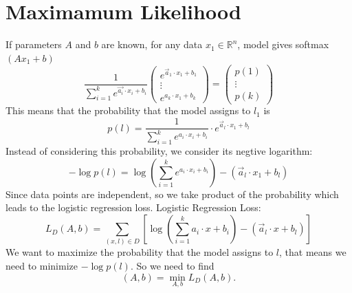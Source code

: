 \section{Maximamum Likelihood}
If parameters $A$ and $b$ are known, for any data $x_1\in \mathbb{R}^n$, model gives softmax  $\left( Ax_1+b\right) $ \newline
$$
\frac{1}{\sum_{i=1}^{k} e^{\vec{a_{i}}\cdot x_{i}+b_{i}}} 
\left(\begin{array}{c}e^{\vec{a}_{1}\cdot x_{1} +b_{1}} \\ \vdots \\ e^{a_{k} \cdot x_{1}+b_{k}}\end{array}\right)
=
\left(\begin{array}{c}
p(1)
 \\ \vdots \\ 
p(k)
 \end{array}\right)
$$ 
This means that the probability that the model assigns to $l_{1}$ is
$$
p(l)=\frac{1}{\sum_{i=1}^{k} e^{a_{i}\cdot x_{i}+b_{i}}} \cdot e^{\vec{a}_{l} \cdot x_{1}+b_{l}}
$$  
Instead of considering this probability, we consider its negtive logarithm: \newline
$$
-\log p(l)=\log \left(\sum_{i=1}^{k} e^{a_{i} \cdot x_{i}+b_{i}}\right)-\left(\vec{a}_{l} \cdot x_{1}+b_{l}\right)
$$  
Since data points are independent, so we take product of the probability which leads to the logistic regression loss.\newline
Logistic Regression Loss: 
$$
L_{D}(A, b)=\sum_{(x, l) \in D}\left[\log \left(\sum_{i=1}^{k} a_{i} \cdot x+b_{i}\right)-\left(\vec{a}_{l} \cdot x+b_{l}\right)\right]
$$  
We want to maximize the probability that the model assigns to $l$, that means we need to minimize $-\log p(l)$. So we need to find 
$$
(A, b)=\min _{A, b} L_{D}(A, b).
$$


